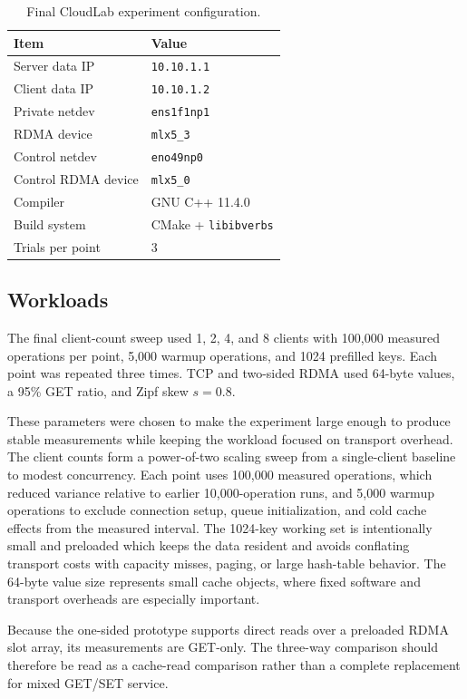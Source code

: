 \documentclass[letterpaper,twocolumn,10pt]{article}
\begin{document}
\begin{table}[h!]
\centering
\caption{Final CloudLab experiment configuration.}
\label{tab:environment}
\begin{tabular}{ll}
\toprule
Item & Value \\
\midrule
Server data IP & \texttt{10.10.1.1} \\
Client data IP & \texttt{10.10.1.2} \\
Private netdev & \texttt{ens1f1np1} \\
RDMA device & \texttt{mlx5\_3} \\
Control netdev & \texttt{eno49np0} \\
Control RDMA device & \texttt{mlx5\_0} \\
Compiler & GNU C++ 11.4.0 \\
Build system & CMake + \texttt{libibverbs} \\
Trials per point & 3 \\
\bottomrule
\end{tabular}
\end{table}

\subsection{Workloads}

The final client-count sweep used 1, 2, 4, and 8 clients with 100,000 measured
operations per point, 5,000 warmup operations, and 1024 prefilled keys.  Each
point was repeated three times.  TCP and two-sided RDMA used 64-byte values, a
95\% GET ratio, and Zipf skew $s=0.8$.

These parameters were chosen to make the experiment large enough to produce stable measurements while keeping the workload focused on transport overhead. The client counts form a power-of-two scaling sweep from a single-client baseline to modest concurrency.  Each point uses 100,000 measured operations, which reduced variance relative to earlier 10,000-operation runs, and 5,000 warmup operations to exclude connection setup, queue initialization, and cold cache effects from the measured interval.  The 1024-key working set is intentionally small and preloaded which keeps the data resident and avoids conflating transport costs with capacity misses, paging, or large hash-table behavior.  The 64-byte value size represents small cache objects, where fixed software and transport overheads are especially important.




Because the one-sided prototype supports
direct reads over a preloaded RDMA slot array, its measurements are GET-only. The
three-way comparison should therefore be read as a cache-read comparison rather
than a complete replacement for mixed GET/SET service.
\end{document}
